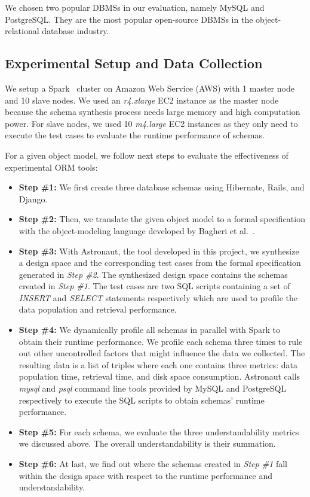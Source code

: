 \documentclass[10pt,conference]{IEEEtran}
\begin{document}
We chosen two popular DBMSs in our evaluation, namely MySQL and PostgreSQL. They are the most popular open-source DBMSs in the object-relational database industry. 

\subsection{Experimental Setup and Data Collection}
We setup a Spark~\cite{spark_paper} cluster on Amazon Web Service (AWS) with 1 master node and 10 slave nodes. We used an \emph{r4.xlarge} EC2 instance as the master node because the schema synthesis process needs large memory and high computation power. For slave nodes, we used 10 \emph{m4.large} EC2 instances as they only need to execute the test cases to evaluate the runtime performance of schemas.  

For a given object model, we follow next steps to evaluate the effectiveness of experimental ORM tools:

\begin{itemize}
\item \textbf{Step \#1:} We first create three database schemas using Hibernate, Rails, and Django.

\item \textbf{Step \#2:} Then, we translate the given object model to a formal specification with the object-modeling language developed by Bagheri et al.~\cite{trademaker}.

\item \textbf{Step \#3:} With Astronaut, the tool developed in this project, we synthesize a design space and the corresponding test cases from the formal specification generated in \textit{Step \#2}. The synthesized design space contains the schemas created in \textit{Step \#1}. The test cases are two SQL scripts containing a set of \textit{INSERT} and \textit{SELECT} statements respectively which are used to profile the data population and retrieval performance. 

\item \textbf{Step \#4:} We dynamically profile all schemas in parallel with Spark to obtain their runtime performance. We profile each schema three times to rule out other uncontrolled factors that might influence the data we collected. The resulting data is a list of triples where each one contains three metrics: data population time, retrieval time, and disk space consumption. Astronaut calls \emph{mysql} and \emph{psql} command line tools provided by MySQL and PostgreSQL respectively to execute the SQL scripts to obtain schemas' runtime performance.

\item \textbf{Step \#5:} For each schema, we evaluate the three understandability metrics we discussed above. The overall understandability is their summation.

\item \textbf{Step \#6:} At last, we find out where the schemas created in \textit{Step \#1} fall within the design space with respect to the runtime performance and understandability.
\end{itemize}
\end{document}
